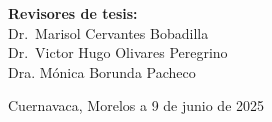 \begin{titlepage}
\begin{minipage}{0.52\textwidth}
\begin{flushright}
\begin{center}
            \textbf{Revisores de tesis:}\\
    
            Dr.\ Marisol Cervantes Bobadilla\\
            Dr.\ Victor Hugo Olivares Peregrino\\
            Dra. Mónica Borunda Pacheco\\
    
            
    \end{center}
    \end{flushright}
    \end{minipage}	
    \vspace*{3cm}
    
    \begin{flushright}
    {\large Cuernavaca, Morelos a 9 de junio de 2025}
    \end{flushright}
    
    \end{titlepage}
